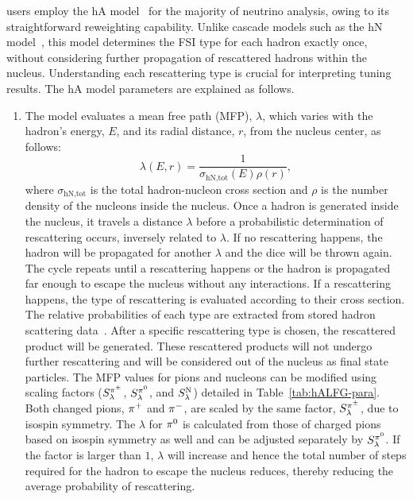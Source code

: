 \genie users employ the hA model~\cite{Andreopoulos:2015wxa} for the majority of neutrino analysis, owing to its straightforward reweighting capability. 
Unlike cascade models such as the hN model~\cite{Andreopoulos:2015wxa}, this model determines the FSI type for each hadron exactly once, without considering further propagation of rescattered hadrons within the nucleus. 
Understanding each rescattering type is crucial for interpreting tuning results.
The hA model parameters are explained as follows.

\begin{enumerate}
    \item 
    The model evaluates a mean free path (MFP), $\lambda$, which varies with the hadron's energy, $E$, and its radial distance, $r$, from the nucleus center,  as follows:
    \begin{equation}
        \lambda(E,r) = \frac{1}{\sigma_\textrm{hN,tot}(E)\rho(r)},
    \end{equation}
    where $\sigma_\textrm{hN,tot}$ is the total hadron-nucleon cross section and $\rho$ is the number density of the nucleons inside the nucleus. 
    Once a hadron is generated inside the nucleus, it travels a distance $\lambda$ before a probabilistic determination of rescattering occurs, inversely related to  $\lambda$. 
    If no rescattering happens, the hadron will be propagated for another $\lambda$ and the dice will be thrown again. 
    The cycle repeats until a rescattering happens or the hadron is propagated far enough to escape the nucleus without any interactions. 
    If a rescattering happens, the type of rescattering is evaluated according to their cross section. 
    The relative probabilities of each type are extracted from stored hadron scattering data~\cite{LADS:1999dyv,Navon:1983xj,Carroll:1976hj,Clough:1974qt,BAUHOFF1986429,Mashnik:2000up,Ishibashi:1997gbe}. 
    After a specific rescattering type is chosen, the rescattered product will be generated. 
    These rescattered products will not undergo further rescattering and will be considered out of the nucleus as final state particles.  
    The MFP values for pions and nucleons can be modified using scaling factors ($S_\lambda^{\pi^{\pm}}$, $S_\lambda^{\pi^{0}}$,  and $S_\lambda^\textrm{N}$) detailed in Table~\ref{tab:hALFG-para}. 
    Both changed pions, $\pi^+$ and $\pi^-$, are scaled by the same factor, $S_\lambda^{\pi^{\pm}}$, due to isospin symmetry.
    The $\lambda$ for $\pi^0$ is calculated from those of charged pions based on isospin symmetry as well and can be adjusted separately by $S_\lambda^{\pi^{0}}$. 
    If the factor is larger than $1$, $\lambda$ will increase and hence the total number of steps required for the hadron to escape the nucleus reduces, thereby reducing the average probability of rescattering. 

\end{enumerate}
